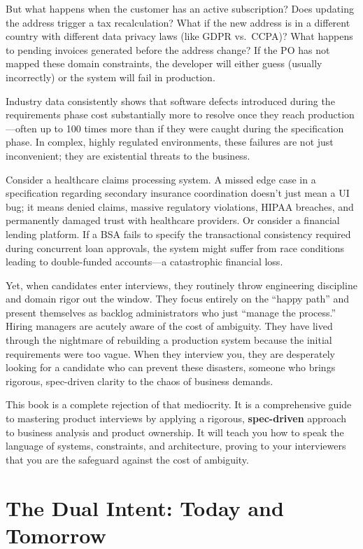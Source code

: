 But what happens when the customer has an active subscription? Does
updating the address trigger a tax recalculation? What if the new
address is in a different country with different data privacy laws (like
GDPR vs.~CCPA)? What happens to pending invoices generated before the
address change? If the PO has not mapped these domain constraints, the
developer will either guess (usually incorrectly) or the system will
fail in production.

Industry data consistently shows that software defects introduced during
the requirements phase cost substantially more to resolve once they
reach production---often up to 100 times more than if they were caught
during the specification phase. In complex, highly regulated
environments, these failures are not just inconvenient; they are
existential threats to the business.

Consider a healthcare claims processing system. A missed edge case in a
specification regarding secondary insurance coordination doesn't just
mean a UI bug; it means denied claims, massive regulatory violations,
HIPAA breaches, and permanently damaged trust with healthcare providers.
Or consider a financial lending platform. If a BSA fails to specify the
transactional consistency required during concurrent loan approvals, the
system might suffer from race conditions leading to double-funded
accounts---a catastrophic financial loss.

Yet, when candidates enter interviews, they routinely throw engineering
discipline and domain rigor out the window. They focus entirely on the
``happy path'' and present themselves as backlog administrators who just
``manage the process.'' Hiring managers are acutely aware of the cost of
ambiguity. They have lived through the nightmare of rebuilding a
production system because the initial requirements were too vague. When
they interview you, they are desperately looking for a candidate who can
prevent these disasters, someone who brings rigorous, spec-driven
clarity to the chaos of business demands.

This book is a complete rejection of that mediocrity. It is a
comprehensive guide to mastering product interviews by applying a
rigorous, \textbf{spec-driven} approach to business analysis and product
ownership. It will teach you how to speak the language of systems,
constraints, and architecture, proving to your interviewers that you are
the safeguard against the cost of ambiguity.

\section{The Dual Intent: Today and
Tomorrow}\label{the-dual-intent-today-and-tomorrow}

